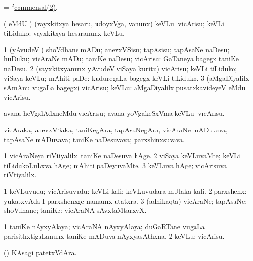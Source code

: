 \bentry
{}
\gl{\nA}
\bmng
= \hyperref{kandict_c.pdf}{C}{commensal(2)2}{$^2$commensal(2)}. 
\emng
\eentry

\bentry
{}
\gl{\sakirx}
\bmng
( eMdU \parx) (vayxkitxya hesaru, udoyxVga, \mo vanunx) keVLu; vicArisu; keVLi tiLiduko:  vayxkitxya hesaranunx keVLu. 
\emng

\noindent 
\gl{\akirx}
\bmng
\bnum
\num{1} (yAvudeV \vi) shoVdhane mADu; anevxVSisu; tapAsisu; tapAsaNe naDesu; huDuku; vicAraNe mADu; taniKe naDesu; vicArisu:  GaTaneya bagegx taniKe naDesu. 
\num{2} (vayxkitxyanunx yAvudeV viSaya kuritu) vicArisu; keVLi tiLiduko; viSaya keVLu; mAhiti paDe:  kuduregaLa bagegx keVLi tiLiduko. 
\num{3} (aMgaDiyalilx sAmAnu \mo vugaLa bagegx) vicArisu; keVLu:  aMgaDiyalilx pusatxkavideyeV eMdu vicArisu. 
\enum
\emng

\noindent 
\gl{\pagu}
\bmng
{}  avanu heVgidAdxneMdu vicArisu; avana yoVgakeSxVma keVLu, vicArisu. 
\emng
\eentry

\bentry
{}
\gl{\nA}
\bmng
vicAraka; anevxVSaka; taniKegAra; tapAsaNegAra; vicAraNe mADuvava; tapAsaNe mADuvava; taniKe naDesuvava; parxshinxsuvava. 
\emng
\eentry

\bentry
{}
\gl{\kirxvi}
\bmng
\bnum
\num{1} vicAraNeya riVtiyalilx; taniKe naDesuva hAge. 
\num{2} viSaya keVLuvaMte; keVLi tiLidukoLuLxva hAge; mAhiti paDeyuvaMte. 
\num{3} keVLuva hAge; vicArisuva riVtiyalilx. 
\enum
\emng
\eentry

\bentry
{}
\gl{\nA}
\bmng
\bnum
\num{1} keVLuvudu; vicArisuvudu:  keVLi kali; keVLuvudara mUlaka kali. 
\num{2} parxshenx:  yukatxvAda I parxshenxge namamx utatxra. 
\num{3} (adhikaqta) vicAraNe; tapAsaNe; shoVdhane; taniKe:  vicAraNA sAvxtaMtarxyX. 
\enum
\emng

\noindent 
\gl{\pagu}
\bmng
\bnum
\num{1}  taniKe nAyxyAlaya; vicAraNA nAyxyAlaya; duGaRTane \mo vugaLa parisithxtigaLanunx taniKe mADuva nAyxyasAthxna. 
\num{2}  keVLu; vicArisu. 
\enum
\emng
\eentry

\bentry
{}
\gl{\nA}
\bmng
(\birx) KAsagi patetxVdAra. 
\emng
\eentry


